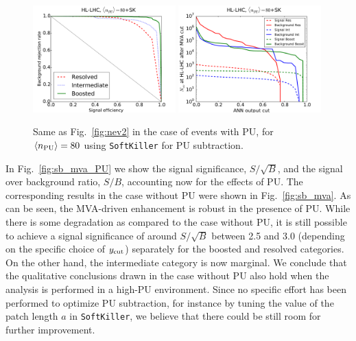 \begin{figure}[t]
  \begin{center}
    \includegraphics[width=0.49\textwidth]{plots/roc_SKPU80.pdf}
\includegraphics[width=0.49\textwidth]{plots/nev2_SKPU80.pdf}
\caption{\small Same as Fig.~\ref{fig:nev2} in the
case of events with PU, for
$\left\langle n_{\rm PU}\right\rangle=80$ using
{\tt SoftKiller} for PU subtraction.
}
\label{fig:nev2_PU}
\end{center}
\end{figure}


In Fig.~\ref{fig:sb_mva_PU} we show the signal significance,
$S/\sqrt{B}$, and the signal over background ratio,
$S/B$, accounting now for the effects of PU.
%
The corresponding results in the case without PU were shown in
Fig.~\ref{fig:sb_mva}.
%
As can be seen, the MVA-driven enhancement is robust in the
presence of PU.
%
While
there is some degradation as compared to the case
without PU,
it is still possible to
achieve a signal significance of
around $S/\sqrt{B}$ between 2.5 and 3.0 (depending on the
specific choice of $y_{\rm cut}$)
separately for the boosted and resolved
categories.
%
On the other hand, the intermediate category is now marginal.
%
We conclude that the qualitative conclusions drawn
in the case without PU also hold when the analysis
is performed in a high-PU environment.
%
Since no specific effort has been performed to
optimize PU subtraction, for instance by tuning the value
of the patch length $a$ in {\tt SoftKiller}, we believe that
there could be still room for further  improvement.


